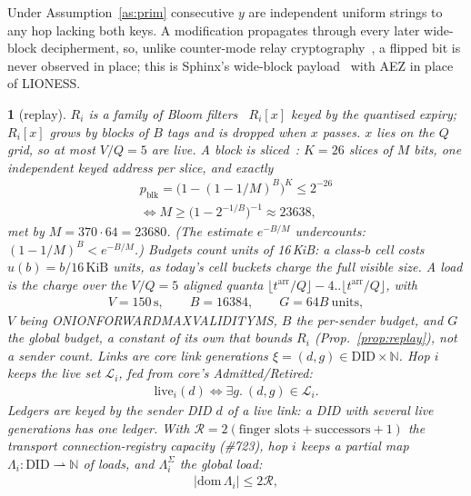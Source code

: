 \documentclass[journal]{IEEEtran}
\newcommand{\namedhead}{}
\newtheorem*{namedenv}{\namedhead}
\newenvironment{lawL}[2]{\renewcommand{\namedhead}{Law #1}%
  \begin{namedenv}[#2]}{\end{namedenv}}
\newcommand{\arr}{t^{\mathrm{arr}}}
\DeclareRobustCommand{\code}[1]{{\ttfamily\renewcommand{\_}{\textunderscore\allowbreak}#1}}
\begin{document}
Under Assumption~\ref{as:prim} consecutive $y$ are independent uniform
strings to any hop lacking both keys.  A modification propagates through
every later wide-block decipherment, so, unlike counter-mode relay
cryptography~\cite{Degabriele2018}, a flipped bit is never observed in
place; this is Sphinx's wide-block payload~\cite{Danezis2009,Anderson1996}
with AEZ in place of LIONESS.

\begin{lawL}{L9}{replay}
$R_i$ is a family of Bloom filters~\cite{Bloom1970} $R_i[x]$ keyed by the
quantised expiry; $R_i[x]$ grows by blocks of $B$ tags and is dropped when
$x$ passes.  $x$ lies on the $Q$ grid, so at most $V/Q=5$ are live.  A
block is sliced~\cite{Almeida2007}: $K=26$ slices of $M$ bits, one
independent keyed address per slice, and exactly
\begin{gather*}
p_{\mathrm{blk}}=\bigl(1-(1-1/M)^{B}\bigr)^{K}\le2^{-26}\\
\iff M\ge\bigl(1-2^{-1/B}\bigr)^{-1}\approx23638,
\end{gather*}
met by $M=370\cdot64=23680$.  (The estimate $e^{-B/M}$ undercounts:
$(1-1/M)^B<e^{-B/M}$.)
Budgets count units of 16\,KiB: a class-$b$ cell costs $u(b)=b/16\,\mathrm{KiB}$
units, as today's cell buckets charge the full visible size.  A load is
the charge over the $V/Q=5$ aligned quanta
$\lfloor\arr/Q\rfloor-4..\lfloor\arr/Q\rfloor$, with
\begin{gather*}
V=150\,\mathrm{s},\qquad B=16384,\qquad G=64B\ \text{units},
\end{gather*}
$V$ being \code{ONION\_FORWARD\_MAX\_VALIDITY\_MS}, $B$ the per-sender
budget, and $G$ the global budget, a constant of its own that bounds
$R_i$ (Prop.~\ref{prop:replay}), not a sender count.
\emph{Links} are core link generations $\xi=(d,g)\in\mathrm{DID}\times\mathbb N$.
Hop $i$ keeps the live set $\mathcal L_i$, fed from core's
\code{Admitted}/\code{Retired}:
\begin{gather*}
\mathrm{live}_i(d)\iff\exists g.\ (d,g)\in\mathcal L_i.
\end{gather*}
\emph{Ledgers} are keyed by the sender DID $d$ of a live link: a DID with
several live generations has one ledger.  With $\mathcal R=2(\text{finger slots}+\text{successors}+1)$ the
transport connection-registry capacity (\#723), hop $i$ keeps a partial
map $\Lambda_i:\mathrm{DID}\rightharpoonup\mathbb N$ of loads, and
$\Lambda_i^{\Sigma}$ the global load:
\begin{gather*}
|\mathrm{dom}\,\Lambda_i|\le2\mathcal R,\\

\end{gather*}
\end{lawL}
\end{document}
